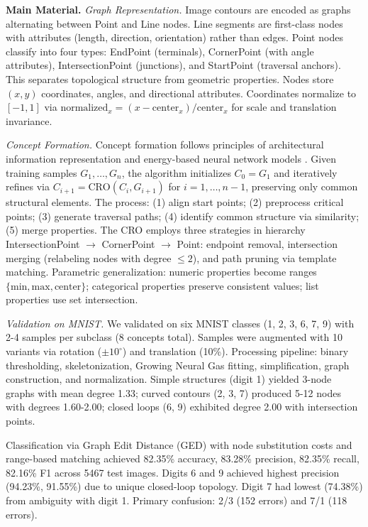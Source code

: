\documentclass[12pt,a4paper]{article}
\begin{document}
\textbf{Main Material.} \textit{Graph Representation.} Image contours are encoded as graphs alternating between Point and Line nodes. Line segments are first-class nodes with attributes (length, direction, orientation) rather than edges. Point nodes classify into four types: EndPoint (terminals), CornerPoint (with angle attributes), IntersectionPoint (junctions), and StartPoint (traversal anchors). This separates topological structure from geometric properties. Nodes store $(x, y)$ coordinates, angles, and directional attributes. Coordinates normalize to $[-1, 1]$ via $\text{normalized}_x = (x - \text{center}_x) / \text{center}_x$ for scale and translation invariance.

\textit{Concept Formation.} Concept formation follows principles of architectural information representation and energy-based neural network models \cite{parzhyn2025architecture,parzhyn2025energy}. Given training samples $G_1, \ldots, G_n$, the algorithm initializes $C_0 = G_1$ and iteratively refines via $C_{i+1} = \text{CRO}(C_i, G_{i+1})$ for $i = 1, \ldots, n-1$, preserving only common structural elements. The process: (1) align start points; (2) preprocess critical points; (3) generate traversal paths; (4) identify common structure via similarity; (5) merge properties. The CRO employs three strategies in hierarchy IntersectionPoint $\to$ CornerPoint $\to$ Point: endpoint removal, intersection merging (relabeling nodes with degree $\leq 2$), and path pruning via template matching. Parametric generalization: numeric properties become ranges $\{\text{min}, \text{max}, \text{center}\}$; categorical properties preserve consistent values; list properties use set intersection.

\textit{Validation on MNIST.} We validated on six MNIST classes (1, 2, 3, 6, 7, 9) with 2-4 samples per subclass (8 concepts total). Samples were augmented with 10 variants via rotation ($\pm 10^\circ$) and translation (10\%). Processing pipeline: binary thresholding, skeletonization, Growing Neural Gas fitting, simplification, graph construction, and normalization. Simple structures (digit 1) yielded 3-node graphs with mean degree 1.33; curved contours (2, 3, 7) produced 5-12 nodes with degrees 1.60-2.00; closed loops (6, 9) exhibited degree 2.00 with intersection points.

Classification via Graph Edit Distance (GED) with node substitution costs and range-based matching achieved 82.35\% accuracy, 83.28\% precision, 82.35\% recall, 82.16\% F1 across 5467 test images. Digits 6 and 9 achieved highest precision (94.23\%, 91.55\%) due to unique closed-loop topology. Digit 7 had lowest (74.38\%) from ambiguity with digit 1. Primary confusion: 2/3 (152 errors) and 7/1 (118 errors).
\end{document}
